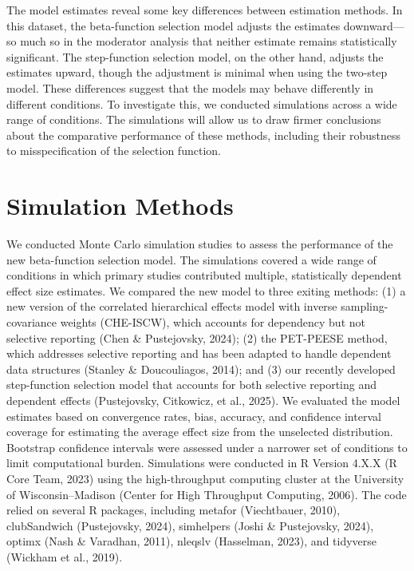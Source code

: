 \documentclass[
  american,
  man, donotrepeattitle,floatsintext]{apa7}
\begin{document}
The model estimates reveal some key differences between estimation methods. In this dataset, the beta-function selection model adjusts the estimates downward---so much so in the moderator analysis that neither estimate remains statistically significant. The step-function selection model, on the other hand, adjusts the estimates upward, though the adjustment is minimal when using the two-step model. These differences suggest that the models may behave differently in different conditions. To investigate this, we conducted simulations across a wide range of conditions. The simulations will allow us to draw firmer conclusions about the comparative performance of these methods, including their robustness to misspecification of the selection function.

\section{Simulation Methods}\label{simulation-methods}

We conducted Monte Carlo simulation studies to assess the performance of the new beta-function selection model. The simulations covered a wide range of conditions in which primary studies contributed multiple, statistically dependent effect size estimates. We compared the new model to three exiting methods: (1) a new version of the correlated hierarchical effects model with inverse sampling-covariance weights (CHE-ISCW), which accounts for dependency but not selective reporting (Chen \& Pustejovsky, 2024); (2) the PET-PEESE method, which addresses selective reporting and has been adapted to handle dependent data structures (Stanley \& Doucouliagos, 2014); and (3) our recently developed step-function selection model that accounts for both selective reporting and dependent effects (Pustejovsky, Citkowicz, et al., 2025). We evaluated the model estimates based on convergence rates, bias, accuracy, and confidence interval coverage for estimating the average effect size from the unselected distribution. Bootstrap confidence intervals were assessed under a narrower set of conditions to limit computational burden. Simulations were conducted in R Version 4.X.X (R Core Team, 2023) using the high-throughput computing cluster at the University of Wisconsin--Madison (Center for High Throughput Computing, 2006). The code relied on several R packages, including metafor (Viechtbauer, 2010), clubSandwich (Pustejovsky, 2024), simhelpers (Joshi \& Pustejovsky, 2024), optimx (Nash \& Varadhan, 2011), nleqslv (Hasselman, 2023), and tidyverse (Wickham et al., 2019).
\end{document}

